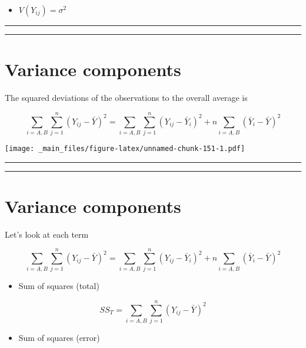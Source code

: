 \documentclass[
]{book}
\providecommand{\tightlist}{%
  \setlength{\itemsep}{0pt}\setlength{\parskip}{0pt}}
\begin{document}
\begin{itemize}
\tightlist
\item
  \(V(Y_{ij})=\sigma^2\)
\end{itemize}

\begin{center}\rule{0.5\linewidth}{0.5pt}\end{center}

\begin{center}\rule{0.5\linewidth}{0.5pt}\end{center}

\hypertarget{variance-components}{%
\section{Variance components}\label{variance-components}}

The squared deviations of the observations to the overall average is

\[\sum_{i=A,B}\sum_{j=1}^n(Y_{ij}-\bar{Y})^2= \sum_{i=A,B}\sum_{j=1}^n(Y_{ij}-\bar{Y}_i)^2+n\sum_{i=A,B}(\bar{Y}_{i}-\bar{Y})^2\]

\texttt{[image: \_main\_files/figure-latex/unnamed-chunk-151-1.pdf]}

\begin{center}\rule{0.5\linewidth}{0.5pt}\end{center}

\begin{center}\rule{0.5\linewidth}{0.5pt}\end{center}

\hypertarget{variance-components-1}{%
\section{Variance components}\label{variance-components-1}}

Let's look at each term

\[\sum_{i=A,B}\sum_{j=1}^n(Y_{ij}-\bar{Y})^2= \sum_{i=A,B}\sum_{j=1}^n(Y_{ij}-\bar{Y}_i)^2+n\sum_{i=A,B}(\bar{Y}_{i}-\bar{Y})^2\]

\begin{itemize}
\tightlist
\item
  Sum of squares (total)
\end{itemize}

\[SS_T=\sum_{i=A,B}\sum_{j=1}^n(Y_{ij}-\bar{Y})^2\]

\begin{itemize}
\tightlist
\item
  Sum of squares (error)
\end{itemize}
\end{document}
